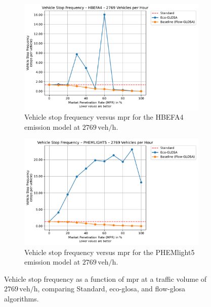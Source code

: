 \begin{figure}[htb]
  \centering
  \begin{subfigure}[b]{0.45\textwidth}
    \includegraphics[width=\textwidth]{data/img/VehicleStopFrequency/VehicleStopFrequency_HBEFA4_Cars2769.pdf}
    \caption{Vehicle stop frequency versus \ac{mpr} for the HBEFA4 emission model at $2769\,\mathrm{veh/h}$.}
  \end{subfigure}\hfill
  \begin{subfigure}[b]{0.45\textwidth}
    \includegraphics[width=\textwidth]{data/img/VehicleStopFrequency/VehicleStopFrequency_PHEMLIGHT5_Cars2769.pdf}
    \caption{Vehicle stop frequency versus \ac{mpr} for the PHEMlight5 emission model at $2769\,\mathrm{veh/h}$.}
  \end{subfigure}
  \caption{Vehicle stop frequency as a function of \ac{mpr} at a traffic volume of $2769\,\mathrm{veh/h}$, comparing Standard, \ac{eco-glosa}, and \ac{flow-glosa} algorithms.}
  \label{fig:StopFreq_2769}
\end{figure}

